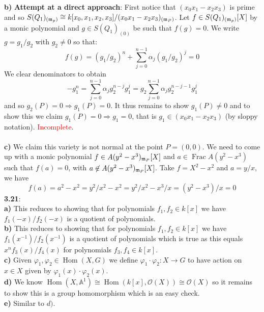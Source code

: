 \documentclass[12pt]{article}
\numberwithin{thm}{subsection}
\numberwithin{defn}{subsection}
\numberwithin{lemma}{subsection}
\numberwithin{example}{subsection}
\numberwithin{notation}{subsection}
\numberwithin{cor}{subsection}
\numberwithin{remark}{subsection}
\numberwithin{condition}{subsection}
\numberwithin{question}{subsection}
\numberwithin{construction}{subsection}
\numberwithin{construction}{subsection}
\numberwithin{construction}{subsection}
\newcommand{\bb}[1]{\mathbb{#1}}
\newcommand{\call}[1]{\mathcal{#1}}
\begin{document}
%
\textbf{b)} 
\textbf{Attempt at a direct approach}: First notice that $(x_0x_1 - x_2x_3)$ is prime and so $S(Q_1)_{(\frak{m}_p)} \cong k[x_0,x_1,x_2,x_3]/(x_0x_1 - x_2x_3)_{(\frak{m}_P)}$. Let $f \in S(Q_1)_{(\frak{m}_p)}[X]$ by a monic polynomial and $g \in S(Q_1)_{(0)}$ be such that $f(g) = 0$. We write $g = g_1/g_2$ with $g_2 \neq 0$ so that:
\[f(g) = (g_1/g_2)^n + \sum_{j = 0}^{n-1}\alpha_j (g_1/g_2)^j = 0\]
We clear denominators to obtain
\[-g_1^n = \sum_{j = 0}^{n-1}\alpha_j g_2^{n-j}g_1^j = g_2\sum_{j=0}^{n-1}\alpha_j g_2^{n-j-1}g_1^j\]
and so $g_2(P) = 0 \Rightarrow g_1(P) = 0$. It thus remains to show $g_1(P) \neq 0$ and to show this we claim $g_1(P) = 0 \Rightarrow g_1 = 0$, that is $g_1 \in (x_0x_1 - x_2x_3)$ (by sloppy notation). \textcolor{red}{Incomplete}.\\\\
%
\textbf{c)} We claim this variety is not normal at the point $P = (0,0)$. We need to come up with a monic polynomial $f \in A(y^2 - x^3)_{\frak{m}_P}[X]$ and $a \in \operatorname{Frac}A(y^2 - x^3)$ such that $f(a) = 0$, with $a \not\in A(y^2 - x^3)_{\frak{m}_P}[X]$. Take $f = X^2 - x^2$ and $a = y/x$, we have
\[f(a) = a^2 - x^2 = y^2/x^2 - x^2 = y^2/x^2 - x^3/x = (y^2 - x^3)/x = 0\]
\textbf{3.21}:\\
\textbf{a)} This reduces to showing that for polynomials $f_1,f_2 \in k[x]$ we have $f_1(-x)/f_2(-x)$ is a quotient of polynomials.\\
\textbf{b)} This reduces to showing that for polynomials $f_1,f_2 \in k[x]$ we have $f_1(x^{-1})/f_2(x^{-1})$ is a quotient of polynomials which is true as this equals $x^n f_3(x)/f_4(x)$ for polynomials $f_3,f_4 \in k[x]$.\\
\textbf{c)} Given $\varphi_1,\varphi_2 \in \operatorname{Hom}(X,G)$ we define $\varphi_1\cdot\varphi_2: X \to G$ to have action on $x \in X$ given by $\varphi_1(x)\cdot\varphi_2(x)$.\\
\textbf{d)} We know $\operatorname{Hom}(X,\bb{A}^1) \cong \operatorname{Hom}(k[x], \call{O}(X)) \cong \call{O}(X)$ so it remains to show this is a group homomorphism which is an easy check.\\
\textbf{e)} Similar to $d)$.\\\\
%
\end{document}
